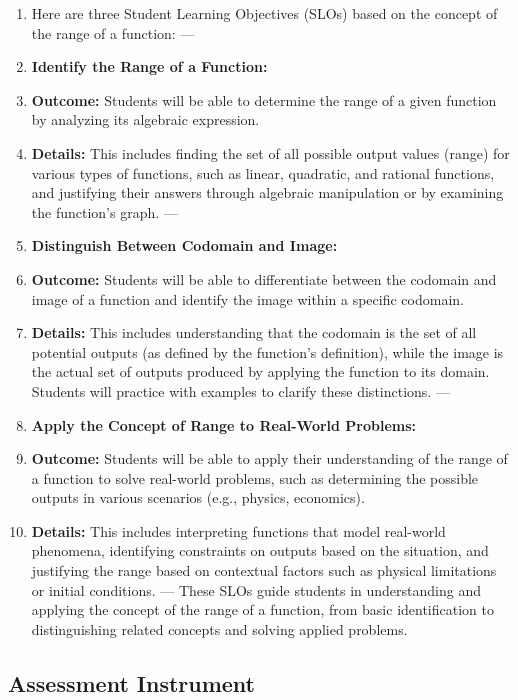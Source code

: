 \begin{enumerate}
    \item Here are three Student Learning Objectives (SLOs) based on the concept of the range of a function: ---
    \item \textbf{Identify the Range of a Function:}
    \item \textbf{Outcome:} Students will be able to determine the range of a given function by analyzing its algebraic expression.
    \item \textbf{Details:} This includes finding the set of all possible output values (range) for various types of functions, such as linear, quadratic, and rational functions, and justifying their answers through algebraic manipulation or by examining the function’s graph. ---
    \item \textbf{Distinguish Between Codomain and Image:}
    \item \textbf{Outcome:} Students will be able to differentiate between the codomain and image of a function and identify the image within a specific codomain.
    \item \textbf{Details:} This includes understanding that the codomain is the set of all potential outputs (as defined by the function’s definition), while the image is the actual set of outputs produced by applying the function to its domain. Students will practice with examples to clarify these distinctions. ---
    \item \textbf{Apply the Concept of Range to Real-World Problems:}
    \item \textbf{Outcome:} Students will be able to apply their understanding of the range of a function to solve real-world problems, such as determining the possible outputs in various scenarios (e.g., physics, economics).
    \item \textbf{Details:} This includes interpreting functions that model real-world phenomena, identifying constraints on outputs based on the situation, and justifying the range based on contextual factors such as physical limitations or initial conditions. --- These SLOs guide students in understanding and applying the concept of the range of a function, from basic identification to distinguishing related concepts and solving applied problems.
\end{enumerate}


\subsection{Assessment Instrument}
\label{ssec:asse-3669}


